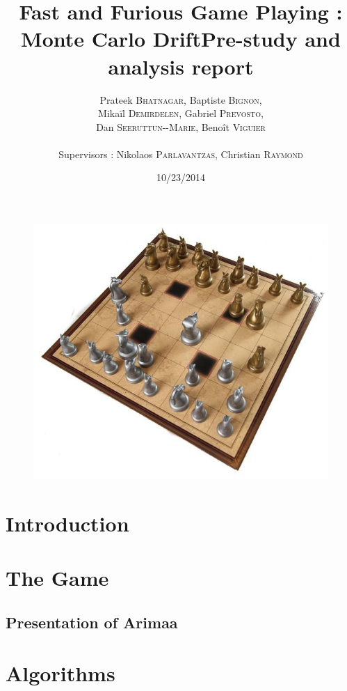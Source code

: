 \documentclass[12pt]{article}
\title{Fast and Furious Game Playing : Monte Carlo Drift\smallbreak Pre-study and analysis report}
\author{Prateek \textsc{Bhatnagar}, Baptiste \textsc{Bignon}, \\
        Mikaïl \textsc{Demirdelen}, Gabriel \textsc{Prevosto}, \\
        Dan \textsc{Seeruttun-{}-Marie}, Benoît \textsc{Viguier} \\
        \\
        Supervisors : Nikolaos \textsc{Parlavantzas}, Christian \textsc{Raymond}}
\date{10/23/2014}
\begin{document}
\maketitle

\begin{figure}[!h] 
\centerline{\includegraphics[scale=0.50]{img/arimaa}}
\end{figure}
\newpage
\begin{abstract}

\end{abstract}



\newpage
\tableofcontents
\newpage


\section{Introduction}

\section{The Game}
\subsection{Presentation of Arimaa} 

\section{Algorithms}

\end{document}

